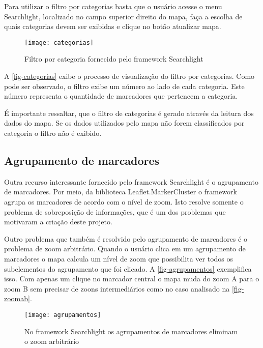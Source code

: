 Para utilizar o filtro por categorias basta que o usuário acesse o menu Searchlight, localizado no campo superior direito do mapa, faça a escolha de quais categorias devem ser exibidas e clique no botão atualizar mapa. 

\begin{figure}[htb]
	\caption{\label{fig-categorias}Filtro por categoria fornecido pelo framework Searchlight}
	\begin{center}
	    \texttt{[image: categorias]}
	\end{center}
\end{figure}

A \autoref{fig-categorias} exibe o processo de visualização do filtro por categorias.
Como pode ser observado, o filtro  exibe um número ao lado de cada categoria. Este número representa o quantidade de marcadores que pertencem a categoria.

É importante ressaltar, que o filtro de categorias é gerado através da leitura dos dados do mapa. Se os dados utilizados pelo mapa não forem classificados por categoria o filtro não é exibido.

\subsection{Agrupamento de marcadores}	
Outra recurso interessante fornecido pelo framework Searchlight é o agrupamento de marcadores. Por meio, da biblioteca Leaflet.MarkerCluster o framework agrupa os marcadores de acordo com o nível de zoom. Isto resolve somente o problema de sobreposição de informações, que é um dos problemas que motivaram a criação deste projeto. 

Outro problema que também é resolvido pelo agrupamento de marcadores é o problema de zoom arbitrário. Quando o usuário clica em um agrupamento de marcadores o mapa calcula um nível de zoom que possibilita ver todos os subelementos do agrupamento que foi clicado. A \autoref{fig-agrupamentos} exemplifica isso. Com apenas um clique no marcador central o mapa muda do zoom A para o zoom B sem precisar de zoons intermediários como no caso analisado na \autoref{fig-zoomab}.


\begin{figure}[htb]
	\caption{\label{fig-agrupamentos}No framework Searchlight os agrupamentos de marcadores eliminam o zoom arbitrário}
	\begin{center}
	    \texttt{[image: agrupamentos]}
	\end{center}
\end{figure}


